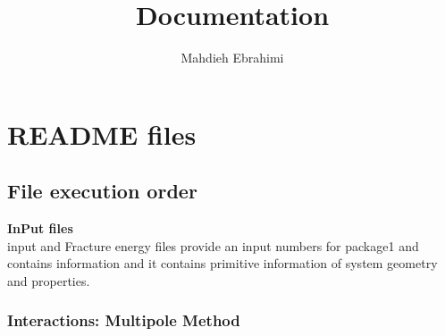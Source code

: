 \documentclass[12pt]{article}
\title{Documentation}
\author{Mahdieh Ebrahimi}
\numberwithin{equation}{subsection}
\begin{document}
\maketitle
\tableofcontents

%
%


\section{README files}

\subsection{File execution order }

\textbf{InPut files}\\
input and Fracture energy files provide an input numbers for package1 and contains information and it contains primitive information of system geometry and properties. 


\subsubsection{Interactions: Multipole Method}
\end{document}
